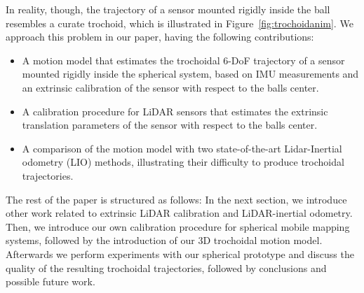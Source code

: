 In reality, though, the trajectory of a sensor mounted rigidly inside the ball resembles a curate trochoid, which is illustrated in Figure~\ref{fig:trochoidanim}.
We approach this problem in our paper, having the following contributions:
\begin{itemize}
  \item A motion model that estimates the trochoidal 6-DoF trajectory of a sensor mounted rigidly inside the spherical system, based on IMU measurements and an extrinsic calibration of the sensor with respect to the balls center.
  \item A calibration procedure for LiDAR sensors that estimates the extrinsic translation parameters of the sensor with respect to the balls center.
  \item A comparison of the motion model with two state-of-the-art Lidar-Inertial odometry (LIO) methods, illustrating their difficulty to produce trochoidal trajectories.
\end{itemize}
The rest of the paper is structured as follows: 
In the next section, we introduce other work related to extrinsic LiDAR calibration and LiDAR-inertial odometry.
Then, we introduce our own calibration procedure for spherical mobile mapping systems, followed by the introduction of our 3D trochoidal motion model.
Afterwards we perform experiments with our spherical prototype and discuss the quality of the resulting trochoidal trajectories, followed by conclusions and possible future work.
